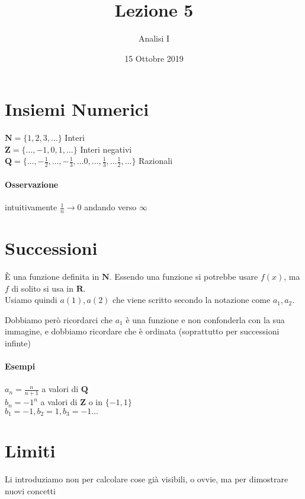 \documentclass[12pt, a4paper]{article}
\date{15 Ottobre 2019}
\title{Lezione 5}
\author{Analisi I}
\begin{document}
\maketitle

\section{Insiemi Numerici}

$\mathbf{N} = \{1, 2, 3, \ldots \}$ Interi \\
$\mathbf{Z} = \{\ldots, -1, 0, 1, \ldots \}$ Interi negativi \\
$\mathbf{Q} = \{\ldots, -\frac{1}{2}, \ldots, -\frac{1}{3}, \ldots 0, \ldots, \frac{1}{3}, \ldots \frac{1}{2}, \ldots\}$ Razionali  

\paragraph{Osservazione} intuitivamente $\frac{1}{n} \to 0$ andando verso $\infty$

\section{Successioni}

\`E una funzione definita in $\mathbf{N}$. Essendo una funzione si potrebbe usare $f(x)$, ma $f$ di solito si usa in $\mathbf{R}$. \\ Usiamo quindi $a(1), a(2)$ che viene scritto secondo la notazione come $a_1, a_2$.

Dobbiamo però ricordarci che $a_1$ \`e una funzione e non confonderla con la sua immagine, e dobbiamo ricordare che \`e  ordinata (soprattutto per successioni infinte)

\paragraph{Esempi} 
\begin{flushleft}
$a_n = \frac{n}{n+1}$ a valori di $\mathbf{Q}$ \\
$b_n = -1^n$ a valori di $\mathbf{Z}$ o in $\{-1, 1\}$ \\
$b_1 = -1, b_2 = 1, b_3 = -1 \ldots$ 
\end{flushleft}

\section{Limiti}

Li introduziamo non per calcolare cose gi\`a visibili, o ovvie, ma per dimostrare nuovi concetti  
\end{document}
